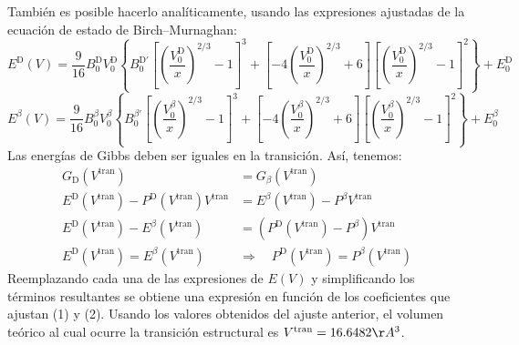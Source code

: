 \documentclass[10pt]{article}
\begin{document}
También es posible hacerlo analíticamente, usando las expresiones 
ajustadas de la ecuación de estado de Birch--Murnaghan:
\begin{equation}
 E^{\mathrm{D}}(V)=\frac{9}{16} B_0^{\mathrm{D}} V_0^{\mathrm{D}} 
 \left\{B_0^{\mathrm{D}'}
 \left[\left(\frac{V_0^{\mathrm{D}}}{x}\right)^{2/3}- 1\right]^3 
 + \left[-4\left(\frac{V_0^{\mathrm{D}}}{x}\right)^{2/3} 
 + 6\right]
 \left[\left(\frac{V_0^{\mathrm{D}}}{x}\right)^{2/3} 
 - 1\right]^2\right\} + E_0^{\mathrm{D}}
\end{equation}
\begin{equation}
 E^{\beta}(V)=\frac{9}{16} B_0^{\beta} V_0^{\beta} 
 \left\{B_0^{\beta'}
 \left[\left(\frac{V_0^{\beta}}{x}\right)^{2/3}- 1\right]^3 
 + \left[-4\left(\frac{V_0^{\beta}}{x}\right)^{2/3} 
 + 6\right]
 \left[\left(\frac{V_0^{\beta}}{x}\right)^{2/3} 
 - 1\right]^2\right\} + E_0^{\beta}
\end{equation}
Las energ\'ias de Gibbs deben ser iguales en la transición. Así,
tenemos:
\begin{align}
 G_{\mathrm{D}}(V^{\mathrm{tran}})&=G_{\beta}(V^{\mathrm{tran}}) \\
 E^{\mathrm{D}}(V^{\mathrm{tran}}) - P^{\mathrm{D}}(V^{\mathrm{tran}}) V^{\mathrm{tran}} &= 
 E^{\beta}(V^{\mathrm{tran}}) - P^{\beta} V^{\mathrm{tran}} \\ 
 E^{\mathrm{D}}(V^{\mathrm{tran}}) -  E^{\beta}(V^{\mathrm{tran}}) &= 
 \left(P^{\mathrm{D}}(V^{\mathrm{tran}})  - P^{\beta} \right) V^{\mathrm{tran}} \\
 E^{\mathrm{D}}(V^{\mathrm{tran}}) = E^{\beta}(V^{\mathrm{tran}}) \quad &\Rightarrow \quad
 P^{\mathrm{D}}(V^{\mathrm{tran}}) = P^{\beta}(V^{\mathrm{tran}})
\end{align}
Reemplazando cada una de las expresiones de $E(V)$ y simplificando 
los términos resultantes se obtiene una expresión en función de 
los coeficientes que ajustan (1) y (2). Usando los valores 
obtenidos 
del ajuste anterior, el volumen teórico al cual ocurre la
transición estructural es $V^{\mathrm{tran}}=16.6482 \AA^3$. 
\end{document}

